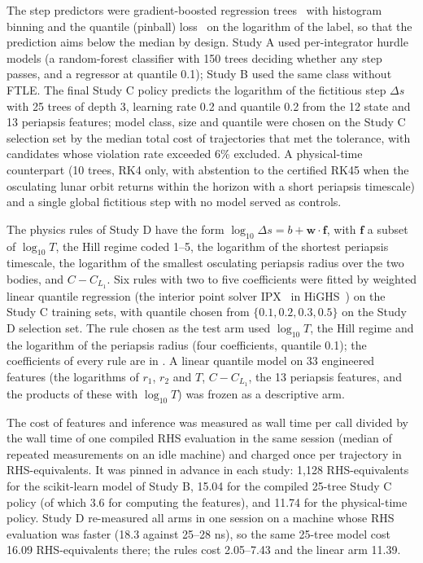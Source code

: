 \documentclass[10pt,letterpaper]{article}
\begin{document}
The step predictors were gradient-boosted regression trees~\cite{friedman2001} with histogram binning and the quantile (pinball) loss~\cite{koenker1978} on the logarithm of the label, so that the prediction aims below the median by design. Study A used per-integrator hurdle models (a random-forest classifier with 150 trees deciding whether any step passes, and a regressor at quantile 0.1); Study B used the same class without FTLE. The final Study C policy predicts the logarithm of the fictitious step $\Delta s$ with 25 trees of depth 3, learning rate 0.2 and quantile 0.2 from the 12 state and 13 periapsis features; model class, size and quantile were chosen on the Study C selection set by the median total cost of trajectories that met the tolerance, with candidates whose violation rate exceeded 6\% excluded. A physical-time counterpart (10 trees, RK4 only, with abstention to the certified RK45 when the osculating lunar orbit returns within the horizon with a short periapsis timescale) and a single global fictitious step with no model served as controls.

The physics rules of Study D have the form $\log_{10}\Delta s = b + \boldsymbol{w}\cdot\boldsymbol{f}$, with $\boldsymbol{f}$ a subset of $\log_{10} T$, the Hill regime coded 1--5, the logarithm of the shortest periapsis timescale, the logarithm of the smallest osculating periapsis radius over the two bodies, and $C - C_{L_1}$. Six rules with two to five coefficients were fitted by weighted linear quantile regression (the interior point solver IPX~\cite{schork2020} in HiGHS~\cite{huangfu2018}) on the Study C training sets, with quantile chosen from $\{0.1, 0.2, 0.3, 0.5\}$ on the Study D selection set. The rule chosen as the test arm used $\log_{10}T$, the Hill regime and the logarithm of the periapsis radius (four coefficients, quantile 0.1); the coefficients of every rule are in . A linear quantile model on 33 engineered features (the logarithms of $r_{1}$, $r_{2}$ and $T$, $C - C_{L_1}$, the 13 periapsis features, and the products of these with $\log_{10} T$) was frozen as a descriptive arm.

The cost of features and inference was measured as wall time per call divided by the wall time of one compiled RHS evaluation in the same session (median of repeated measurements on an idle machine) and charged once per trajectory in RHS-equivalents. It was pinned in advance in each study: 1,128 RHS-equivalents for the scikit-learn model of Study B, 15.04 for the compiled 25-tree Study C policy (of which 3.6 for computing the features), and 11.74 for the physical-time policy. Study D re-measured all arms in one session on a machine whose RHS evaluation was faster (18.3 against 25--28 ns), so the same 25-tree model cost 16.09 RHS-equivalents there; the rules cost 2.05--7.43 and the linear arm 11.39.
\end{document}
